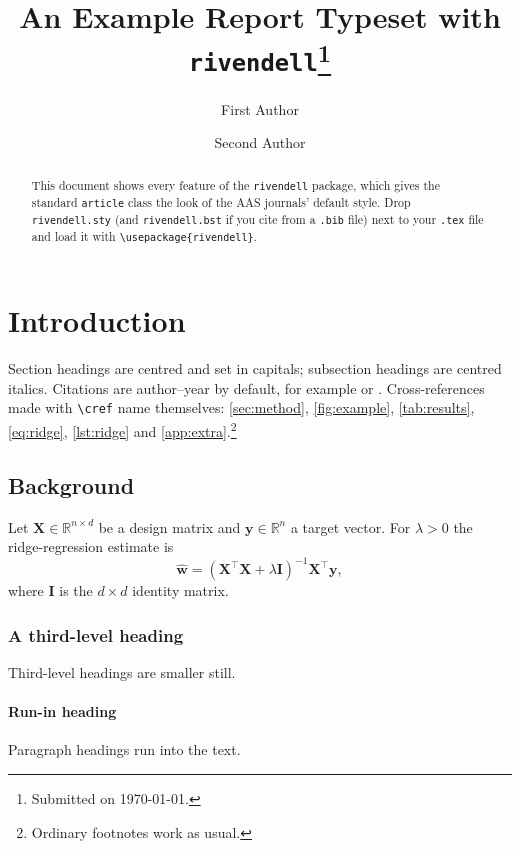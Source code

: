 \documentclass[10pt,a4paper]{article}
\title{An Example Report Typeset with \texttt{rivendell}\thanks{Submitted on \today.}}
\author[1]{First Author}
\author[1,2]{Second Author}
\affil[1]{International Institute of Information Technology, Hyderabad}
\affil[2]{Some Other Lab, Somewhere}
\begin{document}
\maketitle

\begin{abstract}
This document shows every feature of the \texttt{rivendell} package, which gives the
standard \texttt{article} class the look of the AAS journals' default style. Drop
\texttt{rivendell.sty} (and \texttt{rivendell.bst} if you cite from a \texttt{.bib} file)
next to your \texttt{.tex} file and load it with \verb|\usepackage{rivendell}|.
\end{abstract}


\section{Introduction}\label{sec:intro}

Section headings are centred and set in capitals; subsection headings are centred
italics. Citations are author--year by default, for example \citet{lamport94} or
\citep{knuth84}. Cross-references made with \verb|\cref| name themselves:
\cref{sec:method}, \cref{fig:example}, \cref{tab:results}, \cref{eq:ridge},
\cref{lst:ridge} and \cref{app:extra}.\footnote{Ordinary
footnotes work as usual.}

\subsection{Background}

Let $\mathbf{X} \in \mathbb{R}^{n \times d}$ be a design matrix and
$\mathbf{y} \in \mathbb{R}^{n}$ a target vector. For $\lambda > 0$ the ridge-regression
estimate is
\begin{equation}
  \hat{\mathbf{w}} = (\mathbf{X}^\top \mathbf{X} + \lambda \mathbf{I})^{-1}
  \mathbf{X}^\top \mathbf{y},
  \label{eq:ridge}
\end{equation}
where $\mathbf{I}$ is the $d \times d$ identity matrix.

\subsubsection{A third-level heading}

Third-level headings are smaller still.

\paragraph{Run-in heading} Paragraph headings run into the text.
\end{document}
